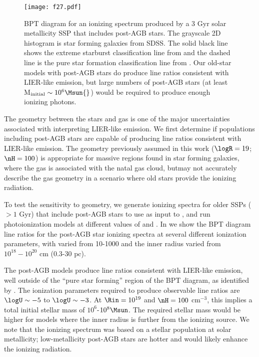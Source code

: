 \begin{figure}[!htbp]
  \begin{centering}
    \texttt{[image: f27.pdf]}
    \caption{BPT diagram for an ionizing spectrum produced by a 3 Gyr solar metallicity SSP that includes post-AGB stars. The grayscale 2D histogram is star forming galaxies from SDSS. The solid black line shows the extreme starburst classification line from \citet{Kewley01} and the dashed line is the pure star formation classification line from \citet{Kauffmann03a}. Our old-star models with post-AGB stars do produce line ratios consistent with LIER-like emission, but large numbers of post-AGB stars (at least M$_{\mathrm{initial}} \sim 10^6\Msun{}$) would be required to produce enough ionizing photons.}
    \label{fig:pAGBBPT}
  \end{centering}
\end{figure}

The geometry between the stars and gas is one of the major uncertainties associated with interpreting LIER-like emission. We first determine if populations including post-AGB stars are capable of producing line ratios consistent with LIER-like emission. The geometry previously assumed in this work ($\logR = 19$; $\nH = 100$) is appropriate for massive \hii regions found in star forming galaxies, where the gas is associated with the natal gas cloud, butmay not accurately describe the gas geometry in a scenario where old stars provide the ionizing radiation.

To test the sensitivity to geometry, we generate ionizing spectra for older SSPs ($>1$ Gyr) that include post-AGB stars to use as input to \Cloudy, and run photoionization models at different values of \Rin{} and \nH{}. In  we show the BPT diagram line ratios for the post-AGB star ionizing spectra at several different ionization parameters, with \nH varied from 10-1000 and the inner radius varied from $10^{18}-10^{20}$ cm (0.3-30 pc). 

The post-AGB models produce line ratios consistent with LIER-like emission, well outside of the ``pure star forming'' region of the BPT diagram, as identified by \citet{Kauffmann03a}. The ionization parameters required to produce observable line ratios are $\logU \sim -5$ to  $\logU \sim -3$. At $\Rin=10^{19}$ and $\nH=100$ cm$^{-3}$, this implies a total initial stellar mass of $10^6$-$10^8\Msun$. The required stellar mass would be higher for models where the inner radius is further from the ionizing source. We note that the ionizing spectrum was based on a stellar population at solar metallicity; low-metallicity post-AGB stars are hotter and would likely enhance the ionizing radiation.

